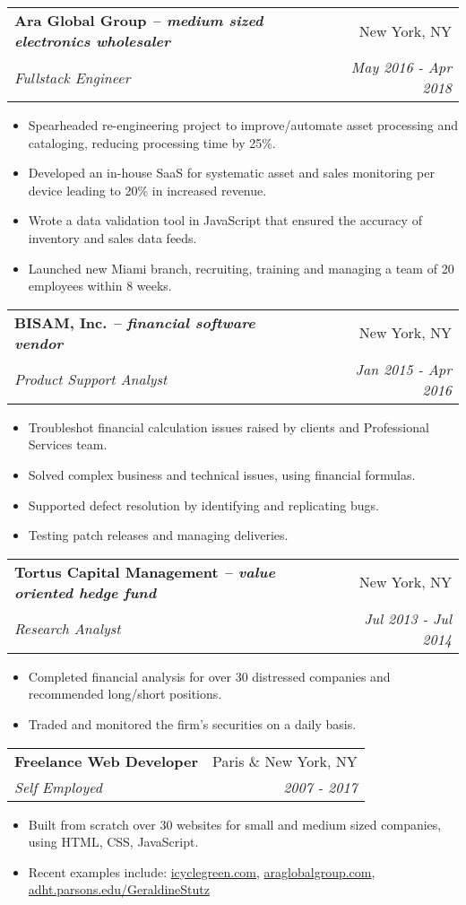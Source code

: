 \documentclass[letterpaper,10pt]{article}
\makeatletter
\newcommand{\resumeItemSimple}[1]{
    \item\small{
      {#1}{\vspace{-2pt}}
    }
  }
\newcommand{\resumeSubheading}[4]{
    \vspace{-1pt}\item
      \begin{tabular*}{0.97\textwidth}{l@{\extracolsep{\fill}}r}
        \textbf{#1} & #2 \\
        \textit{\small#3} & \textit{\small #4} \\
      \end{tabular*}\vspace{-5pt}
  }
\newcommand{\resumeItemListStart}{\begin{itemize}}
\newcommand{\resumeItemListEnd}{\end{itemize}\vspace{-5pt}}
\newcommand{\engineerType}{Fullstack Engineer}
\makeatother
\begin{document}
      \resumeSubheading
        {Ara Global Group \normalfont\textit{-- medium sized electronics wholesaler}}{New York, NY}
        {\engineerType{}}{May 2016 - Apr 2018}
        \resumeItemListStart
        	\resumeItemSimple{Spearheaded re-engineering project to improve/automate asset processing and  cataloging, reducing processing time by 25\%.}
          \resumeItemSimple{Developed an in-house SaaS for systematic asset and sales monitoring per device leading to 20\% in increased revenue.}
          \resumeItemSimple{Wrote a data validation tool in JavaScript that ensured the accuracy of inventory and sales data feeds.}
          \resumeItemSimple{Launched new Miami branch, recruiting, training and managing a team of 20 employees within 8 weeks.}
        \resumeItemListEnd

      \resumeSubheading
        {BISAM, Inc. \normalfont\textit{-- financial software vendor}}{New York, NY}
        {Product Support Analyst}{Jan 2015 - Apr 2016}
        \resumeItemListStart
          \resumeItemSimple{Troubleshot financial calculation issues raised by clients and Professional Services team.}
          \resumeItemSimple{Solved complex business and technical issues, using financial formulas.}
          \resumeItemSimple{Supported defect resolution by identifying and replicating bugs.}
          \resumeItemSimple{Testing patch releases and managing deliveries.}
        \resumeItemListEnd

      \resumeSubheading
        {Tortus Capital Management \normalfont\textit{-- value oriented hedge fund}}{New York, NY}
        {Research Analyst}{Jul 2013 - Jul 2014}
        \resumeItemListStart
          \resumeItemSimple{Completed financial analysis for over 30 distressed companies and recommended long/short positions.}
          \resumeItemSimple{Traded and monitored the firm's securities on a daily basis.}
        \resumeItemListEnd



      \resumeSubheading
        {Freelance Web Developer}{Paris \& New York, NY}
        {Self Employed}{2007 - 2017}
        \resumeItemListStart
          \resumeItemSimple{Built from scratch over 30 websites for small and medium sized companies, using HTML, CSS, JavaScript.}
          \resumeItemSimple{Recent examples include: \href{https://icyclegreen.com}{icyclegreen.com}, \href{https://araglobalgroup.com}{araglobalgroup.com}, \href{http://adht.parsons.edu/GeraldineStutz}{adht.parsons.edu/GeraldineStutz}}
        \resumeItemListEnd
\end{document}
